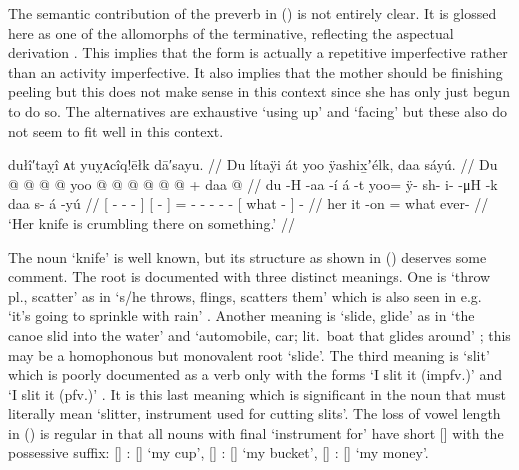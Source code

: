 The semantic contribution of the  preverb in (\lastx) is not entirely clear.
It is glossed here as one of the allomorphs of the terminative, reflecting the aspectual derivation .
This implies that the form is actually a repetitive imperfective rather than an activity imperfective.
It also implies that the mother should be finishing peeling but this does not make sense in this context since she has only just begun to do so.
The alternatives are exhaustive  ‘using up’ and  ‘facing’ but these also do not seem to fit well in this context.

\ex\label{ex:100-131-knife-crumbling}%
%
\begingl
	\glpreamble	dułî′taỵî ᴀt yuỵᴀcîq!ēłk dā′sayu. //
	\glpreamble	Du lítaÿi át yoo ÿashix̱ʼélk, daa sáyú. //
	\gla	{} Du  @ {} @ {} @ {} {}
		{}  @ {} {} 
		yoo @  @ {} @ {} @ {} @ {} @ {} +
		{} daa  {} {} @ {} //
	\glb	{} du  -H -aa -í {} 
		{} á -t {} 
		yoo= ÿ- sh- i-  -μH -k
		{} daa s- {} á -yú //
	\glc	{}[   - - - {}]
		{}[  - {}]
		= - - -  - -
		{}[ what - {}]  - //
	\gld	{} her  {} {} {} {} 
		{} it -on {}
		=  {} {} {} {} {}
		{} what ever- {}  {} //
	\glft	‘Her knife is crumbling there on something.’
		//
\endgl
\xe

The noun  ‘knife’ is well known, but its structure as shown in (\lastx) deserves some comment.
The root  is documented with three distinct meanings.
One is ‘throw pl., scatter’ as in  ‘s/he throws, flings, scatters them’ \parencite[08/44]{leer:1973} which is also seen in e.g.\  ‘it’s going to sprinkle with rain’ \parencite[166.2277]{story-naish:1973}.
Another meaning is ‘slide, glide’ as in  ‘the canoe slid into the water’ \parencite[196.2725]{story-naish:1973} and  ‘automobile, car; lit.\ boat that glides around’ \parencite[08/47]{leer:1973}; this may be a homophonous but monovalent root  ‘slide’.
The third meaning is ‘slit’ which is poorly documented as a verb only with the forms  ‘I slit it (impfv.)’ and  ‘I slit it (pfv.)’ \parencite[08/46]{leer:1973}.
It is this last meaning which is significant in the noun  that must literally mean ‘slitter, instrument used for cutting slits’.
The loss of vowel length in (\lastx) is regular in that all nouns with final  ‘instrument for’ have short [] with the possessive suffix:  [] :  [] ‘my cup’,  [] :  [] ‘my bucket’,  [] :  [] ‘my money’.

